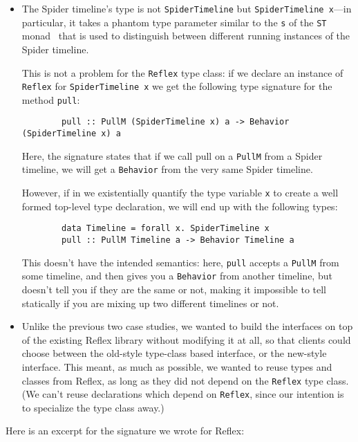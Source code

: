 \begin{itemize}
    \item The Spider timeline's type is not \verb|SpiderTimeline|
        but \verb|SpiderTimeline x|---in particular, it takes a phantom
        type parameter similar to the \verb|s| of the \verb|ST|
        monad~\cite{Launchbury:1994:LFS:773473.178246} that is used to
        distinguish between different running instances of the Spider
        timeline.

        This is not a problem for the \verb|Reflex| type class:
        if we declare an instance of \verb|Reflex| for \verb|SpiderTimeline x|
        we get the following type signature for the method \verb|pull|:

        \begin{lstlisting}
        pull :: PullM (SpiderTimeline x) a -> Behavior (SpiderTimeline x) a\end{lstlisting}
        Here, the signature states that if we call pull on a \verb|PullM|
        from a Spider timeline, we will get a \verb|Behavior|
        from the very same Spider timeline.

        However, if in \Backpack{} we existentially quantify
        the type variable \verb|x| to create a well formed
        top-level type declaration, we will end up with the
        following types:

        \begin{lstlisting}
        data Timeline = forall x. SpiderTimeline x
        pull :: PullM Timeline a -> Behavior Timeline a\end{lstlisting}
        This doesn't have the intended semantics: here, \verb|pull|
        accepts a \verb|PullM| from some timeline, and then gives
        you a \verb|Behavior| from another timeline, but doesn't tell
        you if they are the same or not, making it impossible to tell
        statically if you are mixing up two different timelines or not.

    \item Unlike the previous two case studies, we wanted to build
        the \Backpack{} interfaces on top of the existing Reflex
        library without modifying it at all, so that clients could
        choose between the old-style type-class based interface, or
        the new-style \Backpack{} interface.  This meant, as much
        as possible, we wanted to reuse types and classes from
        Reflex, as long as they did not depend on the \verb|Reflex|
        type class.  (We can't reuse declarations which depend
        on \verb|Reflex|, since our intention is to specialize the
        type class away.)

\end{itemize}
%
Here is an excerpt for the signature we wrote for Reflex:

